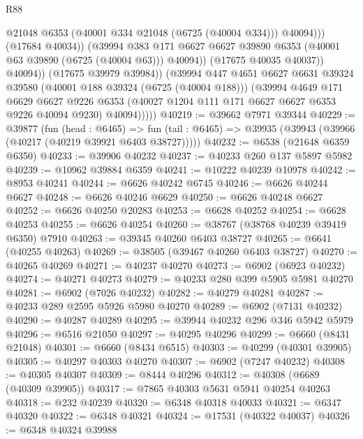 \begin{lexlean}{R88}
\begin{coremodule}
                            @21048
                            @6353
                            (@40001 @334 @21048 (@6725 (@40004 @334)))
                            @40094)))
                      (@17684 @40034))
                    (@39994
                      @383
                      @171
                      @6627
                      @6627
                      @39890
                      @6353
                      (@40001 @63 @39890 (@6725 (@40004 @63)))
                      @40094))
                  (@17675 @40035 @40037))
                @40094))
            (@17675 @39979 @39984))
          (@39994
            @447
            @4651
            @6627
            @6631
            @39324
            @39580
            (@40001 @188 @39324 (@6725 (@40004 @188)))
            (@39994
              @4649
              @171
              @6629
              @6627
              @9226
              @6353
              (@40027 @1204 @111 @171 @6627 @6627 @6353 @9226 @40094 @9230)
              @40094)))))
@40219 := @39662 @7971 @39344
@40229 := @39877
    (fun (head : @6465) =>
    fun (tail : @6465) => @39935 (@39943 (@39966 (@40217 (@40219 @39921 @6403 @38727)))))
@40232 := @6538 (@21648 @6359 @6350)
@40233 := @39906 @40232
@40237 := @40233 @260 @137 @5897 @5982
@40239 := @10962 @39884 @6359
@40241 := @10222 @40239 @10978
@40242 := @8953 @40241
@40244 := @6626 @40242 @6745
@40246 := @6626 @40244 @6627
@40248 := @6626 @40246 @6629
@40250 := @6626 @40248 @6627
@40252 := @6626 @40250 @20283
@40253 := @6628 @40252
@40254 := @6628 @40253
@40255 := @6626 @40254
@40260 := @38767 (@38768 @40239 @39419 @6350) @7910
@40263 := @39345 @40260 @6403 @38727
@40265 := @6641 (@40255 @40263)
@40269 := @38505 (@39467 @40260 @6403 @38727)
@40270 := @40265 @40269
@40271 := @40237 @40270
@40273 := @6902 (@6923 @40232)
@40274 := @40271 @40273
@40279 := @40233 @280 @399 @5905 @5981 @40270
@40281 := @6902 (@7026 @40232)
@40282 := @40279 @40281
@40287 := @40233 @289 @2595 @5926 @5980 @40270
@40289 := @6902 (@7131 @40232)
@40290 := @40287 @40289
@40295 := @39944 @40232 @296 @346 @5942 @5979
@40296 := @6516 @21050
@40297 := @40295 @40296
@40299 := @6660 (@8431 @21048)
@40301 := @6660 (@8434 @6515)
@40303 := @40299 (@40301 @39905)
@40305 := @40297 @40303 @40270
@40307 := @6902 (@7247 @40232)
@40308 := @40305 @40307
@40309 := @8444 @40296
@40312 := @40308 (@6689 (@40309 @39905))
@40317 := @7865 @40303 @5631 @5941 @40254 @40263
@40318 := @232 @40239
@40320 := @6348 @40318 @40033
@40321 := @6347 @40320
@40322 := @6348 @40321
@40324 := @17531 (@40322 @40037)
@40326 := @6348 @40324 @39988

\end{coremodule}
\end{lexlean}
